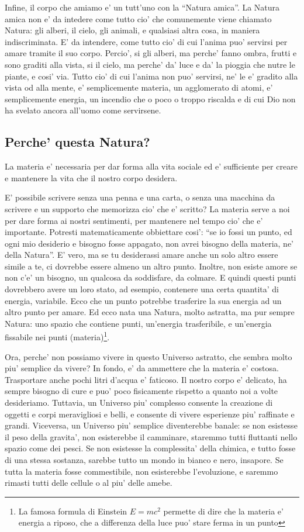 Infine, il corpo che amiamo e' un tutt'uno con la ``Natura amica''.
La Natura amica non e' da intedere come tutto cio' che comunemente viene chiamato Natura: gli alberi, il cielo, gli animali, e qualsiasi altra cosa, in maniera indiscriminata. E' da intendere, come tutto cio' di cui l'anima puo' servirsi per amare tramite il suo corpo. Percio', si gli alberi, ma perche' fanno ombra, frutti e sono graditi alla vista, si il cielo, ma perche' da' luce e da' la pioggia che nutre le piante, e cosi' via. Tutto cio' di cui l'anima non puo' servirsi, ne' le e' gradito alla vista od alla mente, e' semplicemente materia, un agglomerato di atomi, e' semplicemente energia, un incendio che o poco o troppo riscalda e di cui Dio non ha svelato ancora all'uomo come servirsene.


\subsection{Perche' questa Natura?}
La materia e' necessaria per dar forma alla vita sociale ed e' sufficiente per creare e mantenere la vita che il nostro corpo desidera.

E' possibile scrivere senza una penna e una carta, o senza una macchina da scrivere e un supporto che memorizza cio' che e' scritto? 
La materia serve a noi per dare forma ai nostri sentimenti, per mantenere nel tempo cio' che e' importante. Potresti matematicamente obbiettare cosi': ``se io fossi un punto, ed ogni mio desiderio e bisogno fosse appagato, non avrei bisogno della materia, ne' della Natura''. E' vero, ma se tu desiderassi amare anche un solo altro essere simile a te, ci dovrebbe essere almeno un altro punto. Inoltre, non esiste amore se non c'e' un bisogno, un qualcosa da soddisfare, da colmare. E quindi questi punti dovrebbero avere un loro stato, ad esempio, contenere una certa quantita' di energia, variabile. Ecco che un punto potrebbe trasferire la sua energia ad un altro punto per amare. Ed ecco nata una Natura, molto astratta, ma pur sempre Natura: uno spazio che contiene punti, un'energia trasferibile, e un'energia fissabile nei punti (materia)\footnote{La famosa formula di Einstein $E=mc^2$ permette di dire che la materia e' energia a riposo, che a differenza della luce puo' stare ferma in un punto}.

Ora, perche' non possiamo vivere in questo Universo astratto, che sembra molto piu' semplice da vivere? In fondo, e' da ammettere che la materia e' costosa. Trasportare anche pochi litri d'acqua e' faticoso. Il nostro corpo e' delicato, ha sempre bisogno di cure e puo' poco fisicamente rispetto a quanto noi a volte desideriamo. Tuttavia, un Universo piu' complesso consente la creazione di oggetti e corpi meravigliosi e belli, e consente di vivere esperienze piu' raffinate e grandi. Viceversa, un Universo piu' semplice diventerebbe banale: se non esistesse il peso della gravita', non esisterebbe il camminare, staremmo tutti fluttanti nello spazio come dei pesci. Se non esistesse la complessita' della chimica, e tutto fosse di una stessa sostanza, sarebbe tutto un mondo in bianco e nero, insapore. Se tutta la materia fosse commestibile, non esisterebbe l'evoluzione, e saremmo rimasti tutti delle cellule o al piu' delle amebe. 

